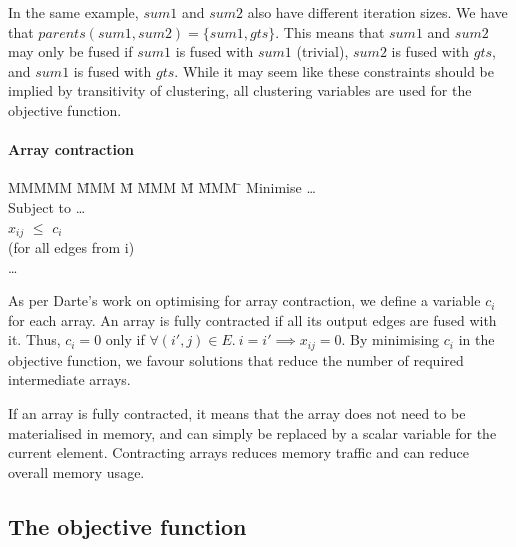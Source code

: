 In the same example, $sum1$ and $sum2$ also have different iteration sizes.
We have that $parents(sum1,sum2) = \{sum1, gts\}$.
This means that $sum1$ and $sum2$ may only be fused if $sum1$ is fused with $sum1$ (trivial), $sum2$ is fused with $gts$, and $sum1$ is fused with $gts$.
While it may seem like these constraints should be implied by transitivity of clustering, all clustering variables are used for the objective function.


\paragraph{Array contraction}
\begin{tabbing}
MMMMM   \= MMM \= M \= MMM \= M \= MMM \= \kill
Minimise   \> \ldots \\
Subject to \> \ldots \\
           \> $x_{ij}$    \> $\le$ \> $c_i$           \>       \>            \\
           \> (for all edges from i)            \\
           \> \ldots \\
\end{tabbing}
As per Darte's work on optimising for array contraction\cite{darte2002contraction}, we define a variable $c_i$ for each array.
An array is fully contracted if all its output edges are fused with it.
Thus, $c_i=0$ only if $\forall (i',j) \in E.\ i = i' \implies x_{ij} = 0$.
By minimising $c_i$ in the objective function, we favour solutions that reduce the number of required intermediate arrays.

If an array is fully contracted, it means that the array does not need to be materialised in memory, and can simply be replaced by a scalar variable for the current element. Contracting arrays reduces memory traffic and can reduce overall memory usage.


\subsection{The objective function}
\label{s:ObjectiveFunction}

